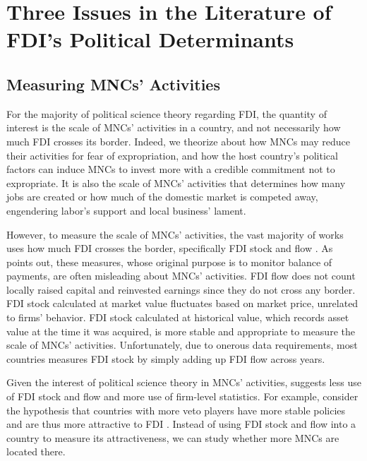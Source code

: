 \section{Three Issues in the Literature of FDI's Political Determinants}
\label{sec:literature_issues}

\subsection{Measuring MNCs' Activities}

For the majority of political science theory regarding FDI, the quantity of interest is the scale of MNCs' activities in a country, and not necessarily how much FDI crosses its border. Indeed, we theorize about how MNCs may reduce their activities for fear of expropriation, and how the host country's political factors can induce MNCs to invest more with a credible commitment not to expropriate. It is also the scale of MNCs' activities that determines how many jobs are created or how much of the domestic market is competed away, engendering labor's support and local business' lament.

However, to measure the scale of MNCs' activities, the vast majority of works uses how much FDI crosses the border, specifically FDI stock and flow \citep{Jensen2003, Ahlquist2006, Beazer2011, Graham2010}. As \citet{Kerner2014} points out, these measures, whose original purpose is to monitor balance of payments, are often misleading about MNCs' activities. FDI flow does not count locally raised capital and reinvested earnings since they do not cross any border. FDI stock calculated at market value fluctuates based on market price, unrelated to firms' behavior. FDI stock calculated at historical value, which records asset value at the time it was acquired, is more stable and appropriate to measure the scale of MNCs' activities. Unfortunately, due to onerous data requirements, most countries measures FDI stock by simply adding up FDI flow across years.

Given the interest of political science theory in MNCs' activities, \citet{Kerner2014} suggests less use of FDI stock and flow and more use of firm-level statistics. For example, consider the hypothesis that countries with more veto players have more stable policies and are thus more attractive to FDI \citep{Li2009a}. Instead of using FDI stock and flow into a country to measure its attractiveness, we can study whether more MNCs are located there.

